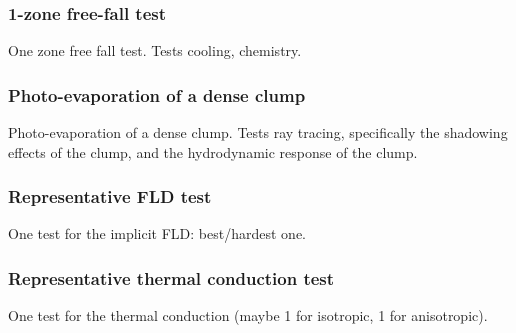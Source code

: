 \subsubsection{1-zone free-fall test}
\label{sec.tests.freefall}
One zone free fall test.  Tests cooling, chemistry.

\subsubsection{Photo-evaporation of a dense clump}
\label{sec.tests.raytracing}
Photo-evaporation of a dense clump.  Tests ray tracing, specifically
the shadowing effects of the clump, and the hydrodynamic response of
the clump.

\subsubsection{Representative FLD test}
\label{sec.tests.fld}
One test for the implicit FLD: best/hardest one.


\subsubsection{Representative thermal conduction test}
\label{sec.tests.conduct}
One test for the thermal conduction (maybe 1 for isotropic, 1 for
anisotropic).
